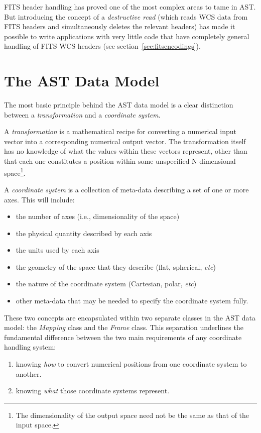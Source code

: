 \documentclass[final,authoryear,5p,times,twocolumn]{elsarticle}
\begin{document}
FITS header handling has proved one of the most complex areas to tame in
AST. But introducing the concept of a \emph{destructive read} (which
reads WCS data from FITS headers and simultaneously deletes the relevant
headers) has made it possible to write applications with very little code
that have completely general handling of FITS WCS headers (see
section~\ref{sec:fitsencodings}).

\section{The AST Data Model}
\label{sec:model}

The most basic principle behind the AST data model is a clear distinction
between a \emph{transformation} and a \emph{coordinate system}.

A \emph{transformation} is a mathematical recipe for converting a numerical
input vector into a corresponding numerical output vector. The
transformation itself has no knowledge of what the values within these
vectors represent, other than that each one constitutes a position within
some unspecified N-dimensional space\footnote{The dimensionality of the
output space need not be the same as that of the input space.}.

A \emph{coordinate system} is a collection of meta-data describing a set of
one or more axes. This will include:
\begin{itemize}
\item the number of axes (i.e., dimensionality of the space)
\item the physical quantity described by each axis
\item the units used by each axis
\item the geometry of the space that they describe (flat, spherical,
\emph{etc})
\item the nature of the coordinate system (Cartesian, polar, \emph{etc})
\item other meta-data that may be needed to specify the coordinate system
fully.
\end{itemize}

These two concepts are encapsulated within two separate classes in the
AST data model: the \emph{Mapping} class and the \emph{Frame} class. This
separation underlines the fundamental difference between the two main
requirements of any coordinate handling system:

\begin{enumerate}
\item knowing \emph{how} to convert numerical positions from one coordinate
system to another.
\item knowing \emph{what} those coordinate systems represent.
\end{enumerate}
\end{document}
